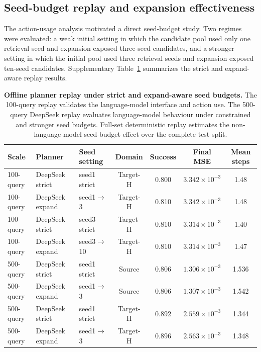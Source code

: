 \documentclass[final,1p,times]{elsarticle}
\begin{document}
\subsection{Seed-budget replay and expansion effectiveness}

The action-usage analysis motivated a direct seed-budget study. Two regimes were evaluated: a weak initial setting in which the candidate pool used only one retrieval seed and expansion exposed three-seed candidates, and a stronger setting in which the initial pool used three retrieval seeds and expansion exposed ten-seed candidates. Supplementary Table~\ref{tab:si_phase3_seed_budget} summarizes the strict and expand-aware replay results.

\begin{table}[htbp!]
\centering
\caption{\textbf{Offline planner replay under strict and expand-aware seed budgets.}
The 100-query replay validates the language-model interface and action use. The 500-query DeepSeek replay evaluates language-model behaviour under constrained and stronger seed budgets. Full-set deterministic replay estimates the non-language-model seed-budget effect over the complete test split.}
\label{tab:si_phase3_seed_budget}
\footnotesize
\setlength{\tabcolsep}{3.6pt}
\renewcommand{\arraystretch}{1.12}
\begin{tabular}{lllcccc}
\toprule
Scale & Planner & Seed setting & Domain & Success & Final MSE & Mean steps \\
\midrule
100-query & DeepSeek strict & seed1 strict & Target-H & 0.800 & $3.342\times10^{-3}$ & 1.48 \\
100-query & DeepSeek expand & seed1$\rightarrow$3 & Target-H & 0.810 & $3.342\times10^{-3}$ & 1.48 \\
100-query & DeepSeek strict & seed3 strict & Target-H & 0.810 & $3.314\times10^{-3}$ & 1.40 \\
100-query & DeepSeek expand & seed3$\rightarrow$10 & Target-H & 0.810 & $3.314\times10^{-3}$ & 1.47 \\
\midrule
500-query & DeepSeek strict & seed1 strict & Source & 0.806 & $1.306\times10^{-3}$ & 1.536 \\
500-query & DeepSeek expand & seed1$\rightarrow$3 & Source & 0.806 & $1.307\times10^{-3}$ & 1.542 \\
500-query & DeepSeek strict & seed1 strict & Target-H & 0.892 & $2.559\times10^{-3}$ & 1.344 \\
500-query & DeepSeek expand & seed1$\rightarrow$3 & Target-H & 0.896 & $2.563\times10^{-3}$ & 1.348 \\

\end{tabular}
\end{table}
\end{document}
